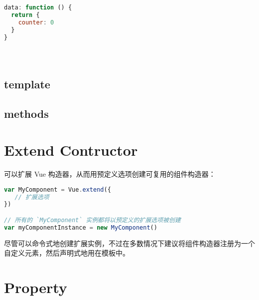 \begin{lstlisting}[language=JavaScript]
data: function () {
  return {
    counter: 0
  }
}
\end{lstlisting}




\begin{lstlisting}[language=JavaScript]

\end{lstlisting}




\begin{lstlisting}[language=JavaScript]

\end{lstlisting}





\begin{lstlisting}[language=JavaScript]

\end{lstlisting}




\subsection{template}


\subsection{methods}




\section{Extend Contructor}


可以扩展 Vue 构造器，从而用预定义选项创建可复用的组件构造器：


\begin{lstlisting}[language=JavaScript]
var MyComponent = Vue.extend({
   // 扩展选项
})

// 所有的 `MyComponent` 实例都将以预定义的扩展选项被创建
var myComponentInstance = new MyComponent()
\end{lstlisting}


尽管可以命令式地创建扩展实例，不过在多数情况下建议将组件构造器注册为一个自定义元素，然后声明式地用在模板中。

\section{Property}

